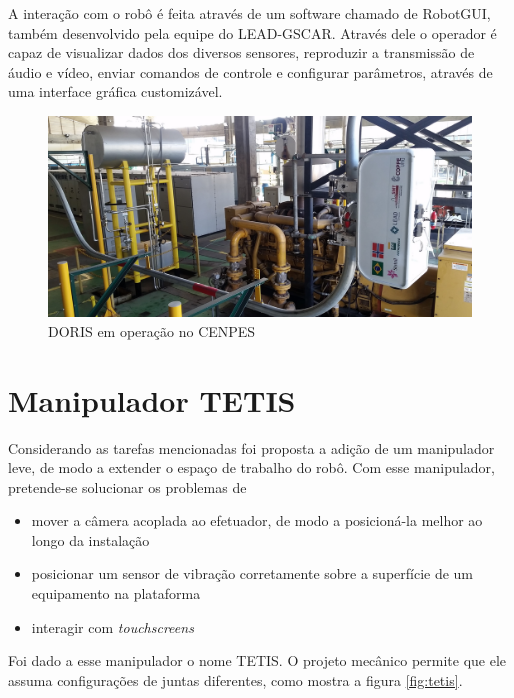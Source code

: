 A interação com o robô é feita através de um software chamado de RobotGUI, também desenvolvido pela equipe do LEAD-GSCAR. Através dele o operador é capaz de visualizar dados dos diversos sensores, reproduzir a transmissão de áudio e vídeo, enviar comandos de controle e configurar parâmetros, através de uma interface gráfica customizável. 

\begin{figure}[!ht]
\centering
  \includegraphics[width=\linewidth]{./img/cenpes_field.jpg}
  \caption{DORIS em operação no CENPES}
  \label{fig:cenpes_doris}
\end{figure}%

\section{Manipulador TETIS}
Considerando as tarefas mencionadas foi proposta a adição de um manipulador leve, de modo a extender o espaço de trabalho do robô. Com esse manipulador, pretende-se solucionar os problemas de
\begin{itemize}
\item mover a câmera acoplada ao efetuador, de modo a posicioná-la melhor ao longo da instalação
\item posicionar um sensor de vibração corretamente sobre a superfície de um equipamento na plataforma
\item interagir com \textit{touchscreens}
\end{itemize}

Foi dado a esse manipulador o nome TETIS. O projeto mecânico permite que ele assuma configurações de juntas diferentes, como mostra a figura \ref{fig:tetis}. 

\newlength{\twosubhtt}
\newsavebox{\twosubboxt}

